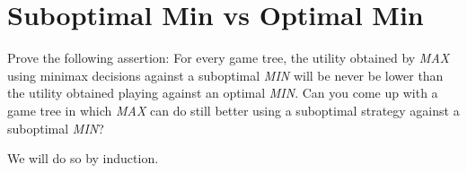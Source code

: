 \documentclass[12pt]{scrartcl}
\begin{document}
\maketitle

\section{Suboptimal Min vs Optimal Min}
\begin{statement}
    Prove the following assertion: For every game tree, the utility obtained by \textit{MAX} using minimax decisions against a suboptimal \textit{MIN} will be never be lower than the utility obtained playing against an optimal \textit{MIN}. Can you come up with a game tree in which \textit{MAX} can do still better using a suboptimal strategy against a suboptimal \textit{MIN}?
\end{statement}

We will do so by induction.
\end{document}
